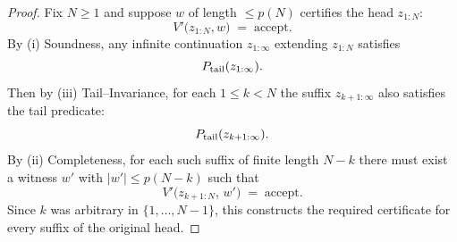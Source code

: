 \documentclass[12pt]{article}
\theoremstyle{definition}
\theoremstyle{plain}
\begin{document}
\begin{proof}
Fix \(N\ge1\) and suppose \(w\) of length \(\le p(N)\) certifies the head \(z_{1:N}\):
\[
  V'\bigl(z_{1:N},w\bigr)\;=\;\text{accept.}
\]
By (i) Soundness, any infinite continuation \(z_{1:\infty}\) extending \(z_{1:N}\) satisfies
\[
  P_{\rm tail}(z_{1:\infty}).
\]
Then by (iii) Tail–Invariance, for each \(1\le k<N\) the suffix \(z_{k+1:\infty}\) also satisfies the tail predicate:
\[
  P_{\rm tail}(z_{k+1:\infty}).
\]
By (ii) Completeness, for each such suffix of finite length \(N-k\) there must exist a witness \(w'\) with
\(\lvert w'\rvert \le p(N-k)\) such that
\[
  V'\bigl(z_{k+1:N},\,w'\bigr)\;=\;\text{accept.}
\]
Since \(k\) was arbitrary in \(\{1,\dots,N-1\}\), this constructs the required certificate for every suffix of the original head.
\end{proof}
\end{document}
